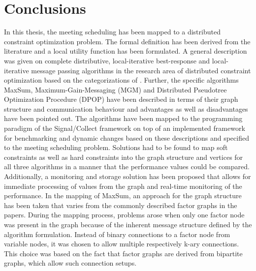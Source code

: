 \chapter{Conclusions}
\label{c:conclusions} 
In this thesis, the meeting scheduling has been mapped to a distributed constraint optimization problem. The formal definition has been derived from the literature and a local utility function has been formulated. A general description was given on complete distributive, local-iterative best-response and local-iterative message passing algorithms in the research area of distributed constraint optimization based on the categorizations of \cite{Chapman2011}. Further, the specific algorithms MaxSum, Maximum-Gain-Messaging (MGM) and  Distributed Pseudotree Optimization Procedure (DPOP) have been described in terms of their graph structure and communication behaviour and advantages as well as disadvantages have been pointed out. The algorithms have been mapped to the programming paradigm of the Signal/Collect framework on top of an implemented framework for benchmarking and dynamic changes based on these descriptions and specified to the meeting scheduling problem. Solutions had to be found to map soft constraints as well as hard constraints into the graph structure and vertices for all three algorithms in a manner that the performance values could be compared. Additionally, a monitoring and storage solution has been proposed that allows for immediate processing of values from the graph and real-time monitoring of the performance.
\newline\newline
 In the mapping of MaxSum, an approach for the graph structure has been taken that varies from the commonly described factor graphs in the papers. During the mapping process, problems arose when only one factor node was present in the graph because of the inherent message structure defined by the algorithm formulation. Instead of binary connections to a factor node from variable nodes, it was chosen to allow multiple respectively k-ary connections. This choice was based on the fact that factor graphs are derived from bipartite graphs, which allow such connection setups.
 \newline \newline
